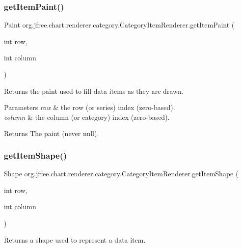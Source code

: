 \subsubsection{\texorpdfstring{get\+Item\+Paint()}{getItemPaint()}}
{\footnotesize\ttfamily Paint org.\+jfree.\+chart.\+renderer.\+category.\+Category\+Item\+Renderer.\+get\+Item\+Paint (\begin{DoxyParamCaption}\item[{int}]{row,  }\item[{int}]{column }\end{DoxyParamCaption})}

Returns the paint used to fill data items as they are drawn.


\begin{DoxyParams}{Parameters}
{\em row} & the row (or series) index (zero-\/based). \\
\hline
{\em column} & the column (or category) index (zero-\/based).\\
\hline
\end{DoxyParams}
\begin{DoxyReturn}{Returns}
The paint (never {\ttfamily null}). 
\end{DoxyReturn}
\mbox{\label{interfaceorg_1_1jfree_1_1chart_1_1renderer_1_1category_1_1_category_item_renderer_a2113db0107c730b0244785e6d7db75bd}} 
\subsubsection{\texorpdfstring{get\+Item\+Shape()}{getItemShape()}}
{\footnotesize\ttfamily Shape org.\+jfree.\+chart.\+renderer.\+category.\+Category\+Item\+Renderer.\+get\+Item\+Shape (\begin{DoxyParamCaption}\item[{int}]{row,  }\item[{int}]{column }\end{DoxyParamCaption})}

Returns a shape used to represent a data item.



